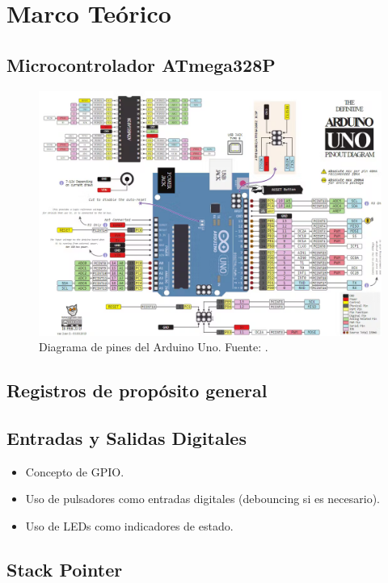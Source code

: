\section{Marco Teórico}

\subsection{Microcontrolador ATmega328P}

\begin{figure}[H]
  \centering
  \includegraphics[width=\linewidth]{./Anexos/Full Arduino Pinout.png}
  \caption{Diagrama de pines del Arduino Uno. Fuente: \cite{arduino_uno_pinout}.}
  \label{fig:arduino-uno-pinout}
\end{figure}

\subsection{Registros de propósito general}

\subsection{Entradas y Salidas Digitales}
\begin{itemize}
    \item Concepto de GPIO.
    \item Uso de pulsadores como entradas digitales (debouncing si es necesario).
    \item Uso de LEDs como indicadores de estado.
\end{itemize}


\subsection{Stack Pointer}


